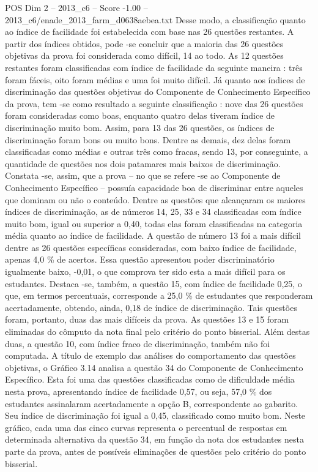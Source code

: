 \begin{textsample}{POS Dim 2 – 2013\_c6 – Score -1.00 – 2013\_c6/enade\_2013\_farm\_d0638aebea.txt}
Desse modo, a classificação quanto ao índice de facilidade foi estabelecida com base nas 26 questões restantes.
A partir dos índices obtidos, pode -se concluir que a maioria das 26 questões objetivas da prova foi considerada como difícil, 14 ao todo.
As 12 questões restantes foram classificadas com índice de facilidade da seguinte maneira : três foram fáceis, oito foram médias e uma foi muito difícil.
Já quanto aos índices de discriminação das questões objetivas do Componente de Conhecimento Específico da prova, tem -se como resultado a seguinte classificação : nove das 26 questões foram consideradas como boas, enquanto quatro delas tiveram índice de discriminação muito bom.
Assim, para 13 das 26 questões, os índices de discriminação foram bons ou muito bons.
Dentre as demais, dez delas foram classificadas como médias e outras três como fracas, sendo 13, por conseguinte, a quantidade de questões nos dois patamares mais baixos de discriminação.
Constata -se, assim, que a prova – no que se refere -se ao Componente de Conhecimento Específico – possuía capacidade boa de discriminar entre aqueles que dominam ou não o conteúdo.
Dentre as questões que alcançaram os maiores índices de discriminação, as de números 14, 25, 33 e 34 classificadas com índice muito bom, igual ou superior a 0,40, todas elas foram classificadas na categoria média quanto ao índice de facilidade.
A questão de número 13 foi a mais difícil dentre as 26 questões específicas consideradas, com baixo índice de facilidade, apenas 4,0 \% de acertos.
Essa questão apresentou poder discriminatório igualmente baixo, -0,01, o que comprova ter sido esta a mais difícil para os estudantes.
Destaca -se, também, a questão 15, com índice de facilidade 0,25, o que, em termos percentuais, corresponde a 25,0 \% de estudantes que responderam acertadamente, obtendo, ainda, 0,18 de índice de discriminação.
Tais questões foram, portanto, duas das mais difíceis da prova.
As questões 13 e 15 foram eliminadas do cômputo da nota final pelo critério do ponto bisserial.
Além destas duas, a questão 10, com índice fraco de discriminação, também não foi computada.
A título de exemplo das análises do comportamento das questões objetivas, o Gráfico 3.14 analisa a questão 34 do Componente de Conhecimento Específico.
Esta foi uma das questões classificadas como de dificuldade média nesta prova, apresentando índice de facilidade 0,57, ou seja, 57,0 \% dos estudantes assinalaram acertadamente a opção B, correspondente ao gabarito.
Seu índice de discriminação foi igual a 0,45, classificado como muito bom.
Neste gráfico, cada uma das cinco curvas representa o percentual de respostas em determinada alternativa da questão 34, em função da nota dos estudantes nesta parte da prova, antes de possíveis eliminações de questões pelo critério do ponto bisserial.

\end{textsample}
